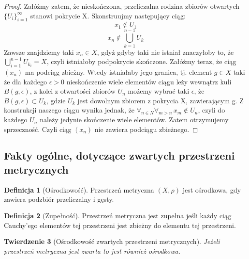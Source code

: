 \documentclass[licencjacka]{pwr_wmat_praca_dyplomowa}
\theoremstyle{plain}
\newtheorem{theorem}{Twierdzenie}
\numberwithin{theorem}{chapter}
\theoremstyle{definition}
\numberwithin{theorem}{chapter}
\newtheorem{definition}[theorem]{Definicja}
\begin{document}
\begin{proof}
Załóżmy zatem, że nieskończona, przeliczalna rodzina zbiorów otwartych $\{U_i\}_{i=1}^{\infty}$ stanowi pokrycie X. Skonstruujmy następujący ciąg: 
$$x_1 \notin U_1$$
$$x_n \notin \bigcup_{k=1}^{n-1} U_k$$ Zawsze znajdziemy taki $x_n \in X$, gdyż gdyby taki nie istniał znaczyłoby to, że $\bigcup_{i=1}^{n-1}{U_{k_i}} = X$, czyli istniałoby podpokrycie skończone. Załóżmy teraz, że ciąg $(x_n)$ ma podciąg zbieżny. Wtedy istniałaby jego granica, tj. element $g \in X$ taki że dla każdego $\epsilon > 0$ nieskończenie wiele elementów ciągu leży wewnątrz kuli $B(g, \epsilon)$, z kolei z otwartości zbiorów $U_n$ możemy wybrać taki $\epsilon$, że $B(g, \epsilon) \subset U_k$, gdzie $U_k$ jest dowolnym zbiorem z pokrycia X, zawierającym g. Z konstrukcji naszego ciągu wynika jednak, że $\forall_{n \in N} \forall_{m>n} \, x_m \notin U_n$, czyli do każdego $U_n$ należy jedynie skończenie wiele elementów. Zatem otrzymujemy sprzeczność. Czyli ciąg $(x_n)$ nie zawiera podciągu zbieżnego.
\end{proof}


\subsection{Fakty ogólne, dotyczące zwartych przestrzeni metrycznych}


\begin{definition}[Ośrodkowość]
Przestrzeń metryczna $(X, \rho)$ jest ośrodkowa, gdy zawiera podzbiór przeliczalny i gęsty.
\end{definition}


\begin{definition}[Zupełność]
Przestrzeń metryczna jest zupełna jeśli każdy ciąg Cauchy'ego elementów tej przestrzeni jest zbieżny do elementu tej przestrzeni.
\end{definition}


\begin{theorem}[Ośrodkowość zwartych przestrzeni metrycznych] \label{zwarta_jest_osrodkowa}
Jeżeli przestrzeń metryczna jest zwarta to jest również ośrodkowa.
\end{theorem}
\end{document}
